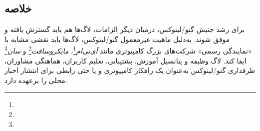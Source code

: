 \subsection{خلاصه}
برای رشد جنبش گنو/لینوکس، درمیان دیگر الزامات، لاگ‌ها هم باید گسترش یافته و موفق شوند.
به‌دلیل ماهیت غیرمعمول گنو/لینوکس، لاگ‌ها باید نقشی مشابه با «نمایندگی رسمی»
شرکت‌های بزرگ کامپیوتری مانند
\emph{آی‌بی‌ام}\footnote{}، \emph{مایکروسافت}\footnote{} و \emph{سان}\footnote{}
ایفا کند. لاگ وظیفه و پتانسیل آموزش، پشتیبانی، تعلیم کاربران، هماهنگی مشاوران،
طرفداری گنو/لینوکس به‌عنوان یک راهکار کامپیوتری و یا حتی رابطی برای انتشار اخبار محلی را برعهده دارد.


